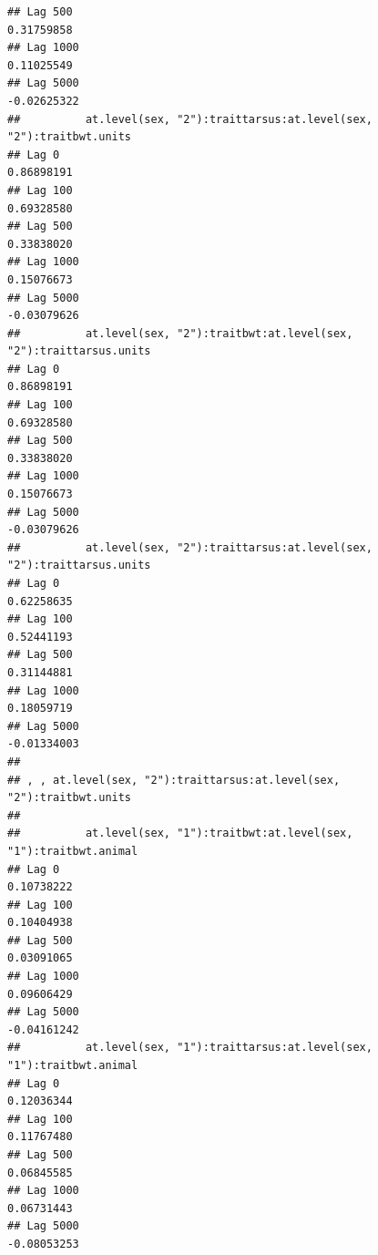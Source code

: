 \documentclass[
  12pt,
]{book}
\begin{document}
\begin{verbatim}
## Lag 500                                                     0.31759858
## Lag 1000                                                    0.11025549
## Lag 5000                                                   -0.02625322
##          at.level(sex, "2"):traittarsus:at.level(sex, "2"):traitbwt.units
## Lag 0                                                          0.86898191
## Lag 100                                                        0.69328580
## Lag 500                                                        0.33838020
## Lag 1000                                                       0.15076673
## Lag 5000                                                      -0.03079626
##          at.level(sex, "2"):traitbwt:at.level(sex, "2"):traittarsus.units
## Lag 0                                                          0.86898191
## Lag 100                                                        0.69328580
## Lag 500                                                        0.33838020
## Lag 1000                                                       0.15076673
## Lag 5000                                                      -0.03079626
##          at.level(sex, "2"):traittarsus:at.level(sex, "2"):traittarsus.units
## Lag 0                                                             0.62258635
## Lag 100                                                           0.52441193
## Lag 500                                                           0.31144881
## Lag 1000                                                          0.18059719
## Lag 5000                                                         -0.01334003
## 
## , , at.level(sex, "2"):traittarsus:at.level(sex, "2"):traitbwt.units
## 
##          at.level(sex, "1"):traitbwt:at.level(sex, "1"):traitbwt.animal
## Lag 0                                                        0.10738222
## Lag 100                                                      0.10404938
## Lag 500                                                      0.03091065
## Lag 1000                                                     0.09606429
## Lag 5000                                                    -0.04161242
##          at.level(sex, "1"):traittarsus:at.level(sex, "1"):traitbwt.animal
## Lag 0                                                           0.12036344
## Lag 100                                                         0.11767480
## Lag 500                                                         0.06845585
## Lag 1000                                                        0.06731443
## Lag 5000                                                       -0.08053253

\end{verbatim}
\end{document}
